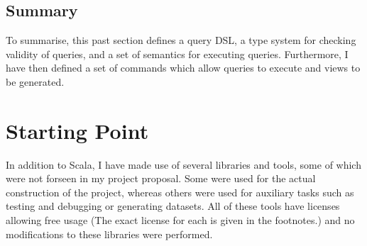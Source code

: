 \documentclass[12pt,a4paper,twoside,openright]{report}
\begin{document}
\subsection{Summary}
To summarise, this past section defines a query DSL, a type system for checking validity of queries, and a set of semantics for executing queries. Furthermore, I have then defined a set of commands which allow queries to execute and views to be generated.


\section{Starting Point}
In addition to Scala, I have made use of several libraries and tools, some of which were not forseen in my project proposal. Some were used for the actual construction of the project, whereas others were used for auxiliary tasks such as testing and debugging or  generating datasets. All of these tools have licenses allowing free usage (The exact license for each is given in the footnotes.) and no modifications to these libraries were performed.\\
\end{document}
